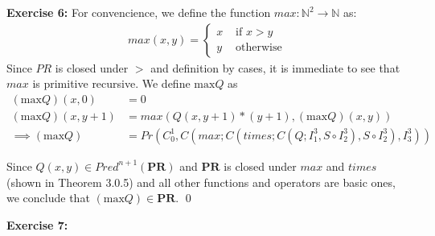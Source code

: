 \documentclass [11pt]{article}
\newcommand{\PR}{\textbf{PR}}
\begin{document}
\bigskip
\noindent
\textbf{Exercise 6:}
For convencience, we define the function $max: \mathbb{N}^2 \rightarrow \mathbb{N}$ as:
\begin{align*}
max(x,y) = \begin{cases}
           x & \text{ if } x > y \\
           y & \text{ otherwise }
           \end{cases}
\end{align*}
Since $PR$ is closed under $>$ and definition by cases, it is immediate to see that $max$ is primitive recursive.
We define $\text{max}Q$ as
\begin{align*}
(\text{max}Q)(x,0) &= 0 \\
(\text{max}Q)(x,y+1) &= max(Q(x,y+1) * (y+1), (\text{max}Q)(x,y)) \\
\implies (\text{max}Q) &= Pr(C^1_0, C(max; C(times; C(Q; I^3_1, S \circ I^3_2), S \circ I^3_2) , I^3_3))
\end{align*}

Since $Q(x,y) \in Pred^{n+1}(\PR)$ and $\PR$ is closed under $max$ and $times$ (shown in Theorem 3.0.5) and all other functions and operators are basic ones, we conclude that $(\text{max}Q) \in \PR$.
\qed

\bigskip
\noindent
\textbf{Exercise 7:}

 
\end{document}
